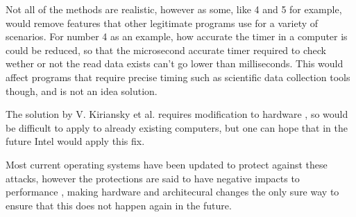 \documentclass[12pt]{article}
\begin{document}
Not all of the methods are realistic, however as some, like 4 and 5 for example, would remove features that other legitimate programs use for a variety of scenarios. For number 4 as an example, how accurate the timer in a computer is could be reduced, so that the microsecond accurate timer required to check wether or not the read data exists can't go lower than milliseconds. This would affect programs that require precise timing such as scientific data collection tools though, and is not an idea solution.

The solution by V. Kiriansky et al. requires modification to hardware \cite[Sec.~3]{Paper:DAWG}, so would be difficult to apply to already existing computers, but one can hope that in the future Intel would apply this fix.

Most current operating systems have been updated to protect against these attacks, however the protections are said to have negative impacts to performance \cite{DigitalFoundry:PatchingVid}, making hardware and architecural changes the only sure way to ensure that this does not happen again in the future.

\printbibliography
\end{document}
